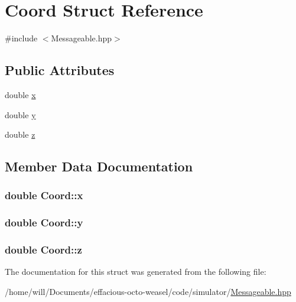 \hypertarget{struct_coord}{}\section{Coord Struct Reference}
\label{struct_coord}


{\ttfamily \#include $<$Messageable.\+hpp$>$}

\subsection*{Public Attributes}
\begin{DoxyCompactItemize}
\item 
double \hyperlink{struct_coord_a0172a22ee75843a96e3a84ebc25f3de7}{x}
\item 
double \hyperlink{struct_coord_af6e543e0522076e717bae53102655b87}{y}
\item 
double \hyperlink{struct_coord_a2bf056108a79437171f18490afbdce2d}{z}
\end{DoxyCompactItemize}


\subsection{Member Data Documentation}
\subsubsection[{\texorpdfstring{x}{x}}]{\setlength{\rightskip}{0pt plus 5cm}double Coord\+::x}\hypertarget{struct_coord_a0172a22ee75843a96e3a84ebc25f3de7}{}\label{struct_coord_a0172a22ee75843a96e3a84ebc25f3de7}
\subsubsection[{\texorpdfstring{y}{y}}]{\setlength{\rightskip}{0pt plus 5cm}double Coord\+::y}\hypertarget{struct_coord_af6e543e0522076e717bae53102655b87}{}\label{struct_coord_af6e543e0522076e717bae53102655b87}
\subsubsection[{\texorpdfstring{z}{z}}]{\setlength{\rightskip}{0pt plus 5cm}double Coord\+::z}\hypertarget{struct_coord_a2bf056108a79437171f18490afbdce2d}{}\label{struct_coord_a2bf056108a79437171f18490afbdce2d}


The documentation for this struct was generated from the following file\+:\begin{DoxyCompactItemize}
\item 
/home/will/\+Documents/effacious-\/octo-\/weasel/code/simulator/\hyperlink{_messageable_8hpp}{Messageable.\+hpp}\end{DoxyCompactItemize}
